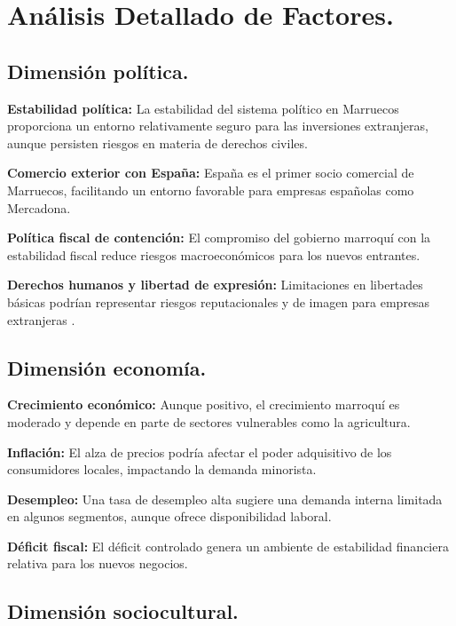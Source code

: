 \documentclass{article}  %
\begin{document}
\section{Análisis Detallado de
Factores.}\label{anuxe1lisis-detallado-de-factores.}

\subsection{Dimensión política.}\label{dimensiuxf3n-poluxedtica.}

\textbf{Estabilidad política:} La estabilidad del sistema político en
Marruecos proporciona un entorno relativamente seguro para las
inversiones extranjeras, aunque persisten riesgos en materia de derechos
civiles.

\textbf{Comercio exterior con España:} España es el primer socio
comercial de Marruecos, facilitando un entorno favorable para empresas
españolas como Mercadona.

\textbf{Política fiscal de contención:} El compromiso del gobierno
marroquí con la estabilidad fiscal reduce riesgos macroeconómicos para
los nuevos entrantes.

\textbf{Derechos humanos y libertad de expresión:} Limitaciones en
libertades básicas podrían representar riesgos reputacionales y de
imagen para empresas extranjeras .

\subsection{Dimensión economía.}\label{dimensiuxf3n-economuxeda.}

\textbf{Crecimiento económico:} Aunque positivo, el crecimiento marroquí
es moderado y depende en parte de sectores vulnerables como la
agricultura.

\textbf{Inflación:} El alza de precios podría afectar el poder
adquisitivo de los consumidores locales, impactando la demanda
minorista.

\textbf{Desempleo:} Una tasa de desempleo alta sugiere una demanda
interna limitada en algunos segmentos, aunque ofrece disponibilidad
laboral.

\textbf{Déficit fiscal:} El déficit controlado genera un ambiente de
estabilidad financiera relativa para los nuevos negocios.

\subsection{Dimensión sociocultural.}\label{dimensiuxf3n-sociocultural.}
\end{document}

